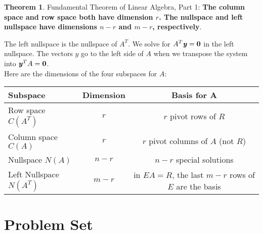 \documentclass[12pt, letterpaper]{article}
\newcommand{\V}[1]{\textbf{\textit{#1}}}
\newcommand{\DefinitionSpace}{\vspace{15px}}
\theoremstyle{definition}
\newtheorem{theorem}{Theorem}
\begin{document}
	\begin{theorem}
		Fundamental Theorem of Linear Algebra, Part 1: 
		\textbf{The column space and row space both have dimension $r$. The nullspace and left nullspace have dimensions $n-r$ and $m-r$, respectively}.
	\end{theorem}\DefinitionSpace
	
	\noindent The left nullspace is the nullspace of $A^T$. We solve for $A^T \V{y} = \textbf{0}$ in the left nullspace. The vectors $y$ go to the left side of $A$ when we transpose the system into $\V{y}^T A = \textbf{0}$. \\
	
	
	\noindent Here are the dimensions of the four subspaces for $A$: 	
		\begin{center}
				\begin{tabular}{ |l|c|c| } 
					\hline
						Subspace & Dimension & Basis for A\\
					\hline
						Row space $C(A^T)$  	& $r$   & $r$ pivot rows of $R$\\ 
						Column space $C(A)$ 	& $r$   & $r$ pivot columns of $A$ (not $R$)\\ 
						Nullspace $N(A)$  		& $n-r$ & $n-r$ special solutions \\
						Left Nullspace $N(A^T)$ & $m-r$ & in $EA = R$, the last $m-r$ rows of $E$ are the basis\\
					\hline
			\end{tabular}
		\end{center}
	
	
	
\section{Problem Set}
	
\end{document}
